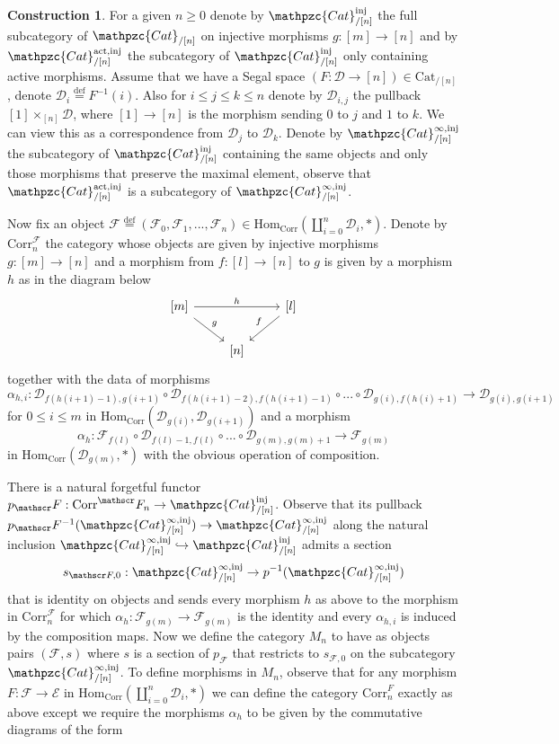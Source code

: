 \documentclass[a4paper, reqno]{amsart}
\theoremstyle{definition}
\newtheorem{construction}[theorem]{Construction}
\newcommand\cD{\mathscr D}
\newcommand\cE{\mathscr E}
\newcommand\cF{\mathscr F}
\newcommand\mor{\mathrm{Hom}}
\newcommand\inj{\mathrm{inj}}
\newcommand\cat{\mathrm{Cat}}
\newcommand\ccat{\mathpzc{Cat}}
\newcommand\bydef{\overset{\mathrm{def}}{=}}
\newcommand\corr{\mathrm{Corr}}
\newcommand\act{\mathrm{act}}
\begin{document}
\begin{construction}\label{constr:n_string}
For a given $n\geq0$ denote by $\ccat^\inj_{/[n]}$ the full subcategory of $\ccat_{/[n]}$ on injective morphisms $g:[m]\rightarrow[n]$ and by $\ccat^{\act, \inj}_{/[n]}$ the subcategory of $\ccat^\inj_{/[n]}$ only containing active morphisms. Assume that we have a Segal space $(F:\cD\rightarrow[n])\in\cat_{/[n]}$, denote $\cD_i\bydef F^{-1}(i)$. Also for $i\leq j\leq k\leq n$ denote by $\cD_{i,j}$ the pullback $[1]\times_{[n]}\cD$, where $[1]\rightarrow[n]$ is the morphism sending $0$ to $j$ and $1$ to $k$.  We can view this as a correspondence from $\cD_j$ to $\cD_k$.  Denote by $\ccat^{\infty,\inj}_{/[n]}$ the subcategory of $\ccat^\inj_{/[n]}$ containing the same objects and only those morphisms that preserve the maximal element, observe that $\ccat^{\act,\inj}_{/[n]}$ is a subcategory of $\ccat^{\infty,\inj}_{/[n]}$.\par
Now fix an object $\cF\bydef(\cF_0,\cF_1,...,\cF_n)\in\mor_\corr(\coprod_{i=0}^n\cD_i,*)$. Denote by $\corr_n^\cF$ the category whose objects are given by injective morphisms $g:[m]\rightarrow[n]$ and a morphism from $f:[l]\rightarrow[n]$ to $g$ is given by a morphism $h$ as in the diagram below
\[
\begin{tikzcd}
{[m]}\arrow[dr, "g"]\arrow[rr, "h"]&{}&{[l]}\arrow[dl, "f" swap]\\
{}&{[n]}
\end{tikzcd}
\]
together with the data of morphisms \[\alpha_{h,i}:\cD_{f(h(i+1)-1),g(i+1)}\circ\cD_{f(h(i+1)-2),f(h(i+1)-1)}\circ...\circ\cD_{g(i),f(h(i)+1)}\rightarrow\cD_{g(i),g(i+1)}\]
for $0\leq i\leq m$ in $\mor_\corr(\cD_{g(i)},\cD_{g(i+1)})$ and a morphism \[\alpha_h:\cF_{f(l)}\circ \cD_{f(l)-1,f(l)}\circ...\circ\cD_{g(m),g(m)+1}\rightarrow\cF_{g(m)}\]
in $\mor_{\corr}(\cD_{g(m)},*)$ with the obvious operation of composition.\par
There is a natural forgetful functor $p_\cF:\corr^\cF_n\rightarrow\ccat^\inj_{/[n]}$. Observe that its pullback $p_\cF^{-1}(\ccat^{\infty,\inj}_{/[n]})\rightarrow\ccat^{\infty,\inj}_{/[n]}$ along the natural inclusion $\ccat^{\infty,\inj}_{/[n]}\hookrightarrow\ccat^{\inj}_{/[n]}$ admits a section 
\[s_{\cF,0}:\ccat^{\infty,\inj}_{/[n]}\rightarrow p^{-1}(\ccat^{\infty,\inj}_{/[n]})\]
that is identity on objects and sends every morphism $h$ as above to the morphism in $\corr_n^\cF$ for which $\alpha_h:\cF_{g(m)}\rightarrow\cF_{g(m)}$ is the identity and every $\alpha_{h,i}$ is induced by the composition maps. Now we define the category $M_n$ to have as objects pairs $(\cF,s)$ where $s$ is a section of $p_\cF$ that restricts to $s_{\cF,0}$ on the subcategory $\ccat^{\infty,\inj}_{/[n]}$. To define morphisms in $M_n$, observe that for any morphism $F:\cF\rightarrow\cE$ in $\mor_\corr(\coprod_{i=0}^n\cD_i,*)$ we can define the category $\corr^F_n$ exactly as above except we require the morphisms $\alpha_h$ to be given by the commutative diagrams of the form

\end{construction}
\end{document}
